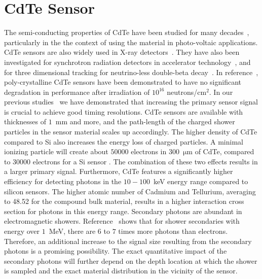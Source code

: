 %
%
%
\section{CdTe Sensor}
\label{sec:siliconpad}
The semi-conducting properties of CdTe have been studied for many decades~\cite{cdtegeneric}, 
particularly in the the context of using the material in photo-voltaic applications.
CdTe sensors are also widely used in X-ray detectors~\cite{cdtesensorsgeneric,cdtesensors2,cdtesensors3}. 
They have also been investigated for synchrotron radiation detectors in accelerator 
technology~\cite{cdtelhc}, and for three dimensional tracking for neutrino-less 
double-beta decay~\cite{Filipenko:2014zta}. In reference~\cite{cdtelhc}, poly-crystalline 
CdTe sensors have been demonstrated to have no significant degradation in
performance after irradiation of $10^{16}$ neutrons/$\mathrm{cm}^{2}$. In our previous 
studies~\cite{Anderson:2015gha,MCPShowerMaxPaper,Ronzhin201552,SiliconTiming,PixelatedMCP,Anderson:2016ygg,Anderson:2015tia} 
we have demonstrated that increasing the primary sensor signal is crucial to achieve good timing resolutions.  
CdTe sensors are available with thicknesses of $1$~mm and more, and the path-length of the charged 
shower particles in the sensor material scales up accordingly. The higher density of CdTe compared 
to Si also increases the energy loss of charged particles. 
A minimal ionizing particle will create about $50000$ electrons in 300~$\mathrm{\mu}$m 
of CdTe, compared to $30000$ electrons for a Si sensor \cite{cdtelhc2}.  The combination of these
two effects results in a larger primary signal. Furthermore, CdTe features 
a significantly higher efficiency for detecting photons in the $10-100$~keV energy range 
compared to silicon sensors. The higher atomic number of Cadmium and Tellurium, averaging 
to 48.52 for the compound bulk material, results in a higher interaction cross section for 
photons in this energy range. Secondary photons are abundant in electromagnetic showers. 
Reference~\cite{Beringer:1900zz} shows that for shower secondaries with energy over 
$1$~MeV, there are $6$ to $7$ times more photons than electrons. Therefore, an 
additional increase to the signal size resulting from the secondary photons is a promising 
possibility. The exact quantitative impact of the secondary photons will further depend 
on the depth location at which the shower is sampled and the exact material distribution 
in the vicinity of the sensor. 

